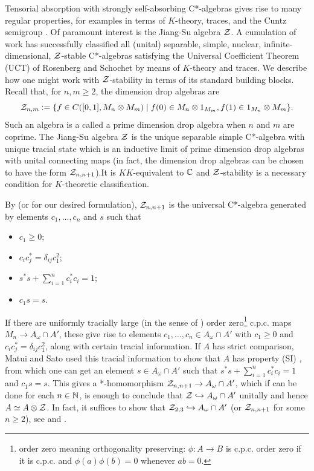 \documentclass[12pt]{amsart}
\begin{document}
Tensorial absorption with strongly self-absorbing C*-algebras gives rise to many regular properties, for examples in terms of $K$-theory, traces, and the Cuntz semigroup \cite{JiangSu99,Rordam91,Rordam92,Rordam04}. Of paramount interest is the  Jiang-Su algebra $\mathcal{Z}$. A cumulation of work has successfully classified all (unital) separable, simple, nuclear, infinite-dimensional, $\mathcal{Z}$-stable C*-algebras satisfying the Universal Coefficient Theorem (UCT) of Rosenberg and Schochet \cite{RosenbergSchochet87} by means of $K$-theory and traces. We describe how one might work with $\mathcal{Z}$-stability in terms of its standard building blocks. Recall that, for $n,m \geq 2$, the dimension drop algebras are
  \begin{equation}
\mathcal{Z}_{n,m} := \{f \in C([0,1],M_n \otimes M_m) \mid f(0) \in M_n \otimes 1_{M_m}, f(1) \in 1_{M_n} \otimes M_m\}. 
  \end{equation}
Such an algebra is a called a prime dimension drop algebra when $n$ and $m$ are coprime. The Jiang-Su algebra $\mathcal{Z}$ is the unique separable simple C*-algebra with unique tracial state which is an inductive limit of prime dimension drop algebras with unital connecting maps \cite{JiangSu99} (in fact, the dimension drop algebras can be chosen to have the form $\mathcal{Z}_{n,n+1}$).It is $KK$-equivalent to $\mathbb{C}$ and $\mathcal{Z}$-stability is a necessary condition for $K$-theoretic classification.

By \cite[Proposition 5.1]{RordamWinter10} (or \cite[Proposition 2.1]{Sato10} for our desired formulation), $\mathcal{Z}_{n,n+1}$ is the universal C*-algebra generated by elements $c_1,\dots,c_n$ and $s$ such that
\begin{itemize}
\item $c_1 \geq 0$;
\item $c_ic_j^* = \delta_{ij}c_1^2$;
\item $s^*s + \sum_{i=1}^n c_i^*c_i = 1$;
\item $c_1s = s$.
\end{itemize}
If there are uniformly tracially large (in the sense of \cite[Definition 2.2]{TomsWhiteWinter15}) order zero\footnote{order zero meaning orthogonality preserving: $\phi: A \to B$ is c.p.c. order zero if it is c.p.c. and $\phi(a)\phi(b) = 0$ whenever $ab = 0$.} c.p.c. maps $M_n \to A_\omega \cap A'$, these give rise to elements $c_1,\dots,c_n \in A_\omega \cap A'$ with $c_1 \geq 0$ and $c_ic_j^* = \delta_{ij}c_1^2$, along with certain tracial information. If $A$ has strict comparison, Matui and Sato used this tracial information to show that $A$ has property (SI) \cite{MatuiSato12}, from which one can get an element $s \in A_\omega \cap A'$ such that $s^*s + \sum_{i=1}^n c_i^*c_i = 1$ and $c_1s = s$. This gives a *-homomorphism $\mathcal{Z}_{n,n+1} \to A_\omega \cap A'$, which if can be done for each $n \in \mathbb{N}$, is enough to conclude that $\mathcal{Z} \hookrightarrow A_\omega \cap A'$ unitally and hence $A \simeq A \otimes \mathcal{Z}$. In fact, it suffices to show that $\mathcal{Z}_{2,3} \hookrightarrow A_\omega \cap A'$ (or $\mathcal{Z}_{n,n+1}$ for some $n \geq 2$), see \cite[Theorem 3.4(ii)]{RordamWinter10} and \cite[Theorem 5.15]{Schemaitat22}. 
\end{document}
